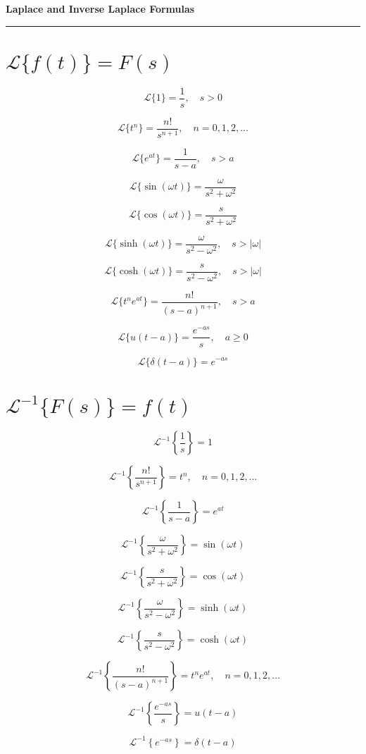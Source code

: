 \documentclass[fleqn]{article}
\begin{document}
\begin{center}
  {\LARGE \textbf{Laplace and Inverse Laplace Formulas}}\\[6pt]
  \rule{\linewidth}{0.5pt}
\end{center}

\begin{multicols}{2}
\small

\section*{$\mathcal{L}\{f(t)\} = F(s)$}

\[
\mathcal{L}\{1\} = \frac{1}{s}, \quad s>0
\]

\[
\mathcal{L}\{t^n\} = \frac{n!}{s^{n+1}}, \quad n=0,1,2,\dots
\]

\[
\mathcal{L}\{e^{at}\} = \frac{1}{s - a}, \quad s > a
\]

\[
\mathcal{L}\{\sin(\omega t)\} = \frac{\omega}{s^2 + \omega^2}
\]

\[
\mathcal{L}\{\cos(\omega t)\} = \frac{s}{s^2 + \omega^2}
\]

\[
\mathcal{L}\{\sinh(\omega t)\} = \frac{\omega}{s^2 - \omega^2}, \quad s > |\omega|
\]

\[
\mathcal{L}\{\cosh(\omega t)\} = \frac{s}{s^2 - \omega^2}, \quad s > |\omega|
\]

\[
\mathcal{L}\{t^n e^{at}\} = \frac{n!}{(s - a)^{n+1}}, \quad s > a
\]

\[
\mathcal{L}\{u(t - a)\} = \frac{e^{-a s}}{s}, \quad a \ge 0
\]

\[
\mathcal{L}\{\delta(t - a)\} = e^{-a s}
\]

\vspace{6pt}

\section*{$\mathcal{L}^{-1}\{F(s)\} = f(t)$}

\[
\mathcal{L}^{-1}\left\{\frac{1}{s}\right\} = 1
\]

\[
\mathcal{L}^{-1}\left\{\frac{n!}{s^{n+1}}\right\} = t^n, \quad n=0,1,2,\dots
\]

\[
\mathcal{L}^{-1}\left\{\frac{1}{s - a}\right\} = e^{at}
\]

\[
\mathcal{L}^{-1}\left\{\frac{\omega}{s^2 + \omega^2}\right\} = \sin(\omega t)
\]

\[
\mathcal{L}^{-1}\left\{\frac{s}{s^2 + \omega^2}\right\} = \cos(\omega t)
\]

\[
\mathcal{L}^{-1}\left\{\frac{\omega}{s^2 - \omega^2}\right\} = \sinh(\omega t)
\]

\[
\mathcal{L}^{-1}\left\{\frac{s}{s^2 - \omega^2}\right\} = \cosh(\omega t)
\]

\[
\mathcal{L}^{-1}\left\{\frac{n!}{(s - a)^{n+1}}\right\} = t^n e^{at}, \quad n=0,1,2,\dots
\]

\[
\mathcal{L}^{-1}\left\{ \frac{e^{-a s}}{s} \right\} = u(t - a)
\]

\[
\mathcal{L}^{-1}\left\{e^{-a s}\right\} = \delta(t - a)
\]

\end{multicols}
\end{document}
